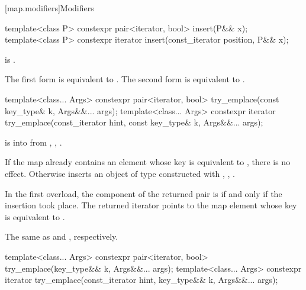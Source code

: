 [map.modifiers]{Modifiers}

%
\begin{itemdecl}
template<class P>
  constexpr pair<iterator, bool> insert(P&& x);
template<class P>
  constexpr iterator insert(const_iterator position, P&& x);
\end{itemdecl}

\begin{itemdescr}
\pnum
\constraints
{} is .

\pnum
\effects
The first form is equivalent to
. The second form is
equivalent to .
\end{itemdescr}

%
\begin{itemdecl}
template<class... Args>
  constexpr pair<iterator, bool> try_emplace(const key_type& k, Args&&... args);
template<class... Args>
  constexpr iterator try_emplace(const_iterator hint, const key_type& k, Args&&... args);
\end{itemdecl}

\begin{itemdescr}
\pnum
\expects
{} is  into 
from , ,
.

\pnum
\effects
If the map already contains an element
whose key is equivalent to ,
there is no effect.
Otherwise inserts an object of type 
constructed with , ,
.

\pnum
\returns
In the first overload,
the  component of the returned pair is 
if and only if the insertion took place.
The returned iterator points to the map element
whose key is equivalent to .

\pnum
\complexity
The same as  and ,
respectively.
\end{itemdescr}

%
\begin{itemdecl}
template<class... Args>
  constexpr pair<iterator, bool> try_emplace(key_type&& k, Args&&... args);
template<class... Args>
  constexpr iterator try_emplace(const_iterator hint, key_type&& k, Args&&... args);
\end{itemdecl}

